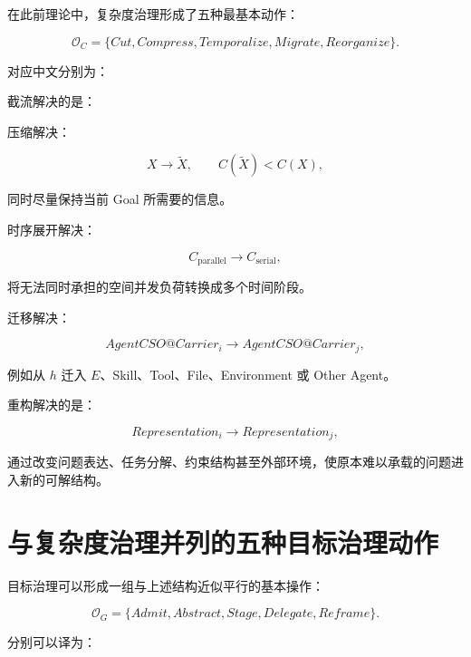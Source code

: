 在此前理论中，复杂度治理形成了五种最基本动作：

\[
\boxed{
\mathcal O_C
=
\{
Cut,
Compress,
Temporalize,
Migrate,
Reorganize
\}.
}
\]

对应中文分别为：

\begin{statementbox}
\centering
{}
\end{statementbox}

截流解决的是：

\begin{statementbox}
\centering
{}
\end{statementbox}

压缩解决：

\[
X
\rightarrow
\widetilde X,
\qquad
C(\widetilde X)<C(X),
\]

同时尽量保持当前 Goal 所需要的信息。

时序展开解决：

\[
C_{\mathrm{parallel}}
\rightarrow
C_{\mathrm{serial}},
\]

将无法同时承担的空间并发负荷转换成多个时间阶段。

迁移解决：

\[
AgentCSO@Carrier_i
\rightarrow
AgentCSO@Carrier_j,
\]

例如从 $h$ 迁入 $E$、Skill、Tool、File、Environment 或 Other Agent。

重构解决的是：

\[
Representation_i
\rightarrow
Representation_j,
\]

通过改变问题表达、任务分解、约束结构甚至外部环境，使原本难以承载的问题进入新的可解结构。


\section{与复杂度治理并列的五种目标治理动作}

目标治理可以形成一组与上述结构近似平行的基本操作：

\[
\boxed{
\mathcal O_G
=
\{
Admit,
Abstract,
Stage,
Delegate,
Reframe
\}.
}
\]

分别可以译为：

\begin{statementbox}
\centering
{}
\end{statementbox}

